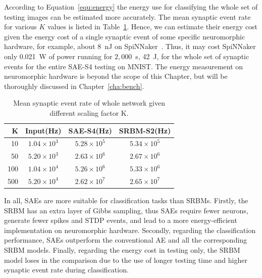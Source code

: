 According to Equation~\ref{equ:energy} the energy use for classifying the whole set of testing images can be estimated more accurately.
The mean synaptic event rate for various $K$ values is listed in Table~\ref{tbl:fire_rate}.
Hence, we can estimate their energy cost given the energy cost of a single synaptic event of some specific neuromorphic hardware, for example, about 8~nJ on SpiNNaker~\citep{stromatias2013power}.
Thus, it may cost SpiNNaker only 0.021~W of power running for $2,000$~s, 42~J, for the whole set of synaptic events for the entire SAE-S4 testing on MNIST.
The energy measurement on neuromorphic hardware is beyond the scope of this Chapter, but will be thoroughly discussed in Chapter~\ref{cha:bench}.
\begin{table}[htbp]
	\centering
	\caption{\label{tbl:fire_rate}Mean synaptic event rate of whole network given different scaling factor K.}
	\bgroup
	\def\arraystretch{1.4}
	\begin{tabular}{r c c c}
		K & Input(Hz) & SAE-S4(Hz) & SRBM-S2(Hz)\\
		\hline
		10 & $1.04 \times 10^3$ & $5.28 \times 10^5$ & $5.34 \times 10^5$ \\
		50 & $5.20 \times 10^3$ & $2.63 \times 10^6$ & $2.67 \times 10^6$ \\
		100 & $1.04 \times 10^4$ & $5.26 \times 10^6$ & $5.33 \times 10^6$ \\
		500 & $5.20 \times 10^4$ & $2.62 \times 10^7$ & $2.65 \times 10^7$ \\
	\end{tabular}
	\egroup
\end{table}

In all, SAEs are more suitable for classification tasks than SRBMs.
Firstly, the SRBM has an extra layer of Gibbs sampling, thus SAEs require fewer neurons, generate fewer spikes and STDP events, and lead to a more energy-efficient implementation on neuromorphic hardware.
Secondly, regarding the classification performance, SAEs outperform the conventional AE and all the corresponding SRBM models.
Finally, regarding the energy cost in testing only, the SRBM model loses in the comparison due to the use of longer testing time and higher synaptic event rate during classification.

